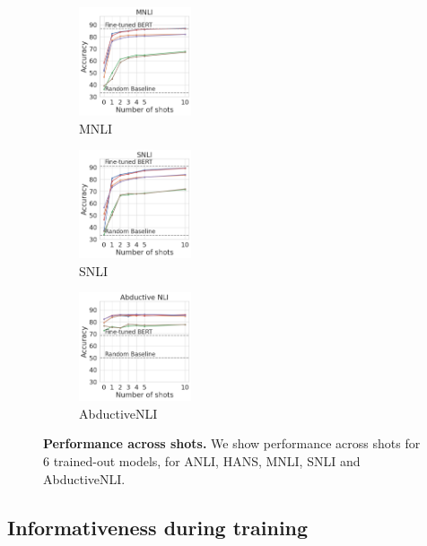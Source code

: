 \begin{figure}[t]
    \begin{subfigure}[b]{0.19\textwidth}
    \centering
    \includegraphics[height=3.2cm, trim=25mm 0 0 0, clip]{figures/mnli_matched}
    \caption{MNLI}
    \label{fig:mnli}
    \end{subfigure}
    \begin{subfigure}[b]{0.19\textwidth}
    \centering
    \includegraphics[height=3.2cm, trim=25mm 0 0 0, clip]{figures/snli}
    \caption{SNLI}
    \label{fig:hansnli}
    \end{subfigure}
    \begin{subfigure}[b]{0.19\textwidth}
    \centering
    \includegraphics[height=3.2cm, trim=25mm 0 0 0, clip]{figures/abductivenli}
    \caption{AbductiveNLI}
    \label{fig:mnli}
    \end{subfigure}
    \caption{\textbf{Performance across shots.} We show performance across shots for 6 trained-out models, for ANLI, HANS, MNLI, SNLI and AbductiveNLI.}\label{fig:shot_performance}
\end{figure}

\subsection{Informativeness during training}\label{subsec:during_training}

